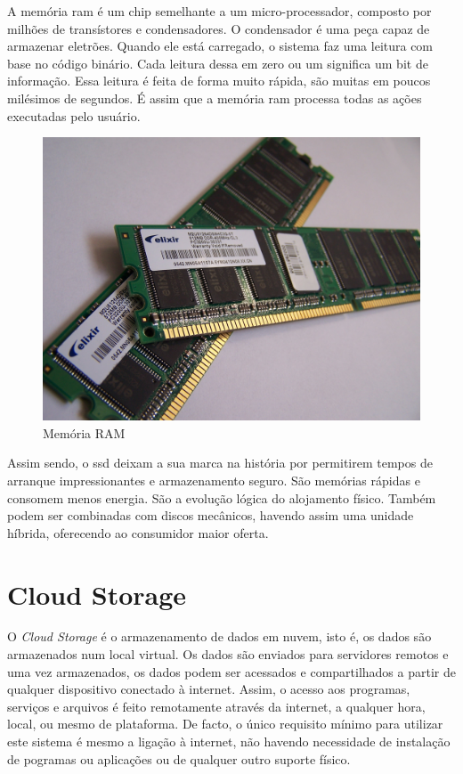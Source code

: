 \documentclass{report}
\begin{document}
\newpage	
	
	A memória \ac{ram} é um chip semelhante a um micro-processador, composto por milhões de transístores e condensadores. O condensador é uma peça capaz de armazenar eletrões. Quando ele está carregado, o sistema faz uma leitura com base no código binário. Cada leitura dessa em zero ou um significa um bit de informação. Essa leitura é feita de forma muito rápida, são muitas em poucos milésimos de segundos. É assim que a memória \ac{ram} processa todas as ações executadas pelo usuário.
\vspace{20mm}

	\begin{figure} [h]
		\centering
		\includegraphics[scale=0.09]{memram.jpg}
		\caption{Memória RAM}
	\end{figure}

\vspace{20mm}	
	
	Assim sendo, o \ac{ssd} deixam a sua marca na história por permitirem tempos de arranque impressionantes e armazenamento seguro. São memórias rápidas e consomem menos energia. São a evolução lógica do alojamento físico. Também podem ser combinadas com discos mecânicos, havendo assim uma unidade híbrida, oferecendo ao consumidor maior oferta.

\newpage

		\section{Cloud Storage}
		
		O \textit{Cloud Storage} é o armazenamento de dados em nuvem, isto é,  os dados são armazenados num local virtual.  Os dados são enviados para servidores remotos e uma vez armazenados, os dados podem ser acessados e compartilhados a partir de qualquer dispositivo conectado à internet.
 Assim, o acesso aos programas, serviços e arquivos é feito remotamente através da internet, a qualquer hora, local, ou mesmo de plataforma. De facto, o único requisito mínimo para utilizar este sistema é mesmo a ligação à internet, não havendo necessidade de instalação de pogramas ou aplicações ou de qualquer outro suporte físico.
\vspace{1mm}
\end{document}
